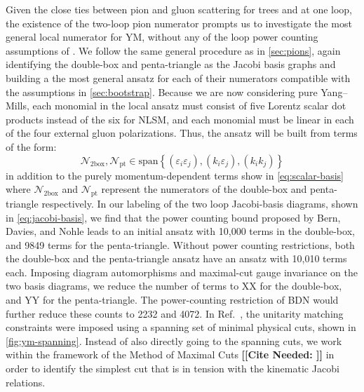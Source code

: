 \documentclass[11pt,letter]{article}
\newcommand{\citepls}[1]{{\bf\color{red}[[Cite Needed: #1]]}}
\begin{document}
Given the close ties between pion and gluon scattering for trees and at one loop, the existence of the two-loop pion numerator prompts us to investigate the most general local numerator for YM, without any of the loop power counting assumptions of  \cite{Bern:2015ooa}.
We follow the same general procedure as in \cref{sec:pions}, again
identifying the double-box and penta-triangle as the Jacobi basis
graphs and building a the most general ansatz for each of their numerators compatible with the assumptions in \cref{sec:bootstrap}.
Because we are now considering pure Yang--Mills, each monomial in the
local ansatz must consist of five Lorentz scalar dot products instead
of the six for NLSM, and each monomial must be linear in each of the
four external gluon polarizations.  Thus, the ansatz will be built
from terms of the form:
\begin{equation}
\mathcal{N}_{\text{2box}},\mathcal{N}_{\text{pt}}\in \text{span}\left\{(\varepsilon_i \varepsilon_j) , (k_i \varepsilon_j), (k_ik_j)\right\}
\end{equation}
in addition to the purely momentum-dependent terms show in
\cref{eq:scalar-basis} where $\mathcal{N}_{\text{2box}}$ and $\mathcal{N}_{\text{pt}}$ represent the numerators of the double-box and penta-triangle respectively.
In our labeling of the two loop Jacobi-basis
diagrams, shown in \cref{eq:jacobi-basis}, we find that the power
counting bound proposed by Bern, Davies, and Nohle leads to an initial
ansatz with 10,000 terms in the double-box, and 9849 terms for the
penta-triangle.  Without power counting restrictions, both the
double-box and the penta-triangle ansatz have an ansatz with 10,010
terms each.  Imposing diagram automorphisms and maximal-cut gauge
invariance on the two basis diagrams, we reduce the number of terms to
XX for the double-box, and YY for the penta-triangle.  The
power-counting restriction of BDN would further reduce these counts to
2232 and 4072.  In Ref.~\cite{Bern:2015ooa}, the unitarity matching
constraints were imposed using a spanning set of minimal physical
cuts, shown in \cref{fig:ym-spanning}.  Instead of also directly going
to the spanning cuts, we work within the framework of the Method of
Maximal Cuts \citepls{} in order to identify the simplest cut that is
in tension with the kinematic Jacobi relations.
\end{document}
